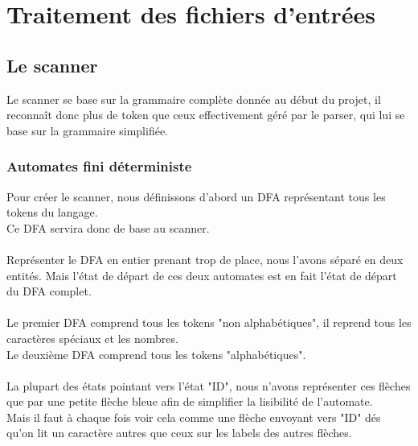 \documentclass[a4paper,10pt]{article}
\begin{document}
\section{Traitement des fichiers d'entrées}

\subsection{Le scanner}
	Le scanner se base sur la grammaire complète donnée au début du projet, il reconnaît donc plus de token que ceux effectivement géré par le parser, qui lui se base sur la grammaire simplifiée.
	
	\subsubsection{Automates fini déterministe}
	Pour créer le scanner, nous définissons d'abord un DFA représentant tous les tokens du langage.\\
	Ce DFA servira donc de base au scanner.\\
	~\\
	Représenter le DFA en entier prenant trop de place, nous l'avons séparé en deux entités. Mais l'état de départ de ces deux automates est en fait l'état de départ du DFA complet.\\
	~\\
	Le premier DFA comprend tous les tokens "non alphabétiques", il reprend tous les caractères spéciaux et les nombres.\\
	Le deuxième DFA comprend tous les tokens "alphabétiques".\\
	~\\
	La plupart des états pointant vers l'état "ID", nous n'avons représenter ces flèches que par une petite flèche bleue afin de simplifier la lisibilité de l'automate.\\
	Mais il faut à chaque fois voir cela comme une flèche envoyant vers "ID" dés qu'on lit un caractère autres que ceux sur les labels des autres flèches.\\
	~\\
\end{document}

